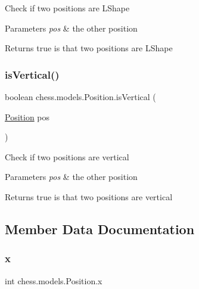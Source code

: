Check if two positions are L\+Shape


\begin{DoxyParams}{Parameters}
{\em pos} & the other position \\
\hline
\end{DoxyParams}
\begin{DoxyReturn}{Returns}
true is that two positions are L\+Shape 
\end{DoxyReturn}
\mbox{\label{classchess_1_1models_1_1_position_a50da6933e82356a80b6f012251189d25}} 
\subsubsection{\texorpdfstring{is\+Vertical()}{isVertical()}}
{\footnotesize\ttfamily boolean chess.\+models.\+Position.\+is\+Vertical (\begin{DoxyParamCaption}\item[{\mbox{\hyperlink{classchess_1_1models_1_1_position}{Position}}}]{pos }\end{DoxyParamCaption})}

Check if two positions are vertical


\begin{DoxyParams}{Parameters}
{\em pos} & the other position \\
\hline
\end{DoxyParams}
\begin{DoxyReturn}{Returns}
true is that two positions are vertical 
\end{DoxyReturn}


\subsection{Member Data Documentation}
\mbox{\label{classchess_1_1models_1_1_position_a9b095a78776d58d10169eb9be3e6ff3e}} 
\subsubsection{\texorpdfstring{x}{x}}
{\footnotesize\ttfamily int chess.\+models.\+Position.\+x\hspace{0.3cm}{\ttfamily [private]}}

